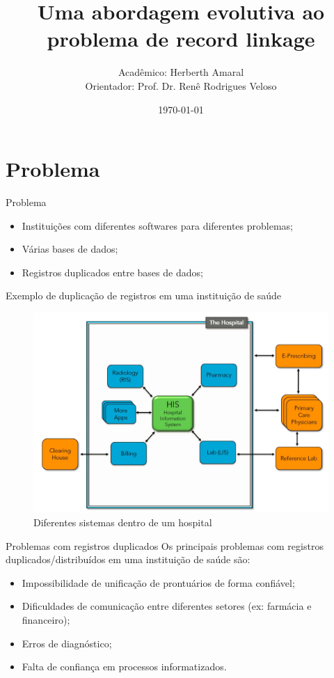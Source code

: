 \documentclass{beamer}
\title{Uma abordagem evolutiva ao problema de record linkage}
\date{\today}
\author{Acadêmico: Herberth Amaral \\
Orientador: Prof. Dr. Renê Rodrigues Veloso}
\institute{Programa de Pós-Graduação em Modelagem Computacional e Sistemas - UNIMONTES}
\begin{document}
  \maketitle

  \section{Problema}

  \begin{frame}{Problema}
      \begin{itemize}
          \item Instituições com diferentes softwares para diferentes problemas;
          \item Várias bases de dados;
          \item Registros duplicados entre bases de dados;
      \end{itemize}
  \end{frame}

  \begin{frame}{Exemplo de duplicação de registros em uma instituição de saúde}
      \begin{figure}
          \centering
          \includegraphics[width=1.0\textwidth]{hospital.jpg}
          \caption{Diferentes sistemas dentro de um hospital \cite{hospital}}
      \end{figure}
  \end{frame}

  \begin{frame}{Problemas com registros duplicados}
      Os principais problemas com registros duplicados/distribuídos em uma instituição de saúde são:

      \begin{itemize}
          \item Impossibilidade de unificação de prontuários de forma confiável;
          \item Dificuldades de comunicação entre diferentes setores (ex: farmácia e financeiro);
          \item Erros de diagnóstico;
          \item Falta de confiança em processos informatizados.
      \end{itemize}
  \end{frame}
\end{document}
